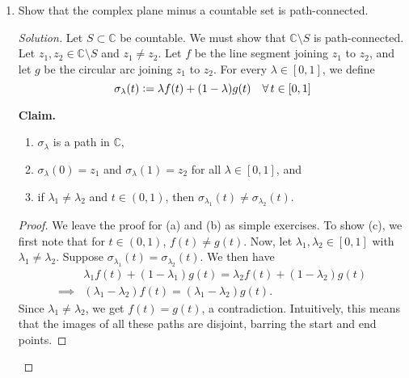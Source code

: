 \documentclass[11pt]{article}
\theoremstyle{definition}
\newenvironment{blockquote}
{\begin{mdframed}[skipabove=0pt, skipbelow=0pt, innertopmargin=4pt, innerbottommargin=4pt, bottomline=false,topline=false,rightline=false, linewidth=2pt]}
{\end{mdframed}}
\newenvironment{soln}{\begin{proof}[Solution]}{\end{proof}}
\begin{document}
\begin{enumerate}[leftmargin=*]
\begin{soln}
        Since $f(z_1, z_2)$ is non-constant at least one of $z_1$ or $z_2$ must ``appear'' in $f(z_1, z_2)$. Without loss of generality, suppose that $z_2$ appears in $f(z_1, z_2)$. We may write
        \[
            f(z_1, z_2) = \sum_{k=0}^n f_k(z_1) \cdot z_2^k
        \]
        where $n \geq 1$ and $f_k(z_1) \in \mathbb{C}[z_1]$. Moreover, $f_n \neq 0$, and thus, $f_n(z_1)$ has only finitely many roots (possibly zero). Thus, there are infinitely many $\alpha \in \mathbb{C}$ such that $f_n(\alpha) \neq 0$. Since, $n \geq 1$, we have that $f(\alpha, z_2) \in \mathbb{C}[z_2]$ is non-constant for all these infinitely many $\alpha$. By FTA, for each such $\alpha$, there exists $\beta \in \mathbb{C}$ such that $f(\alpha, \beta) = 0$. Thus, there are infinitely many roots of $f(z_1, z_2)$ in $\mathbb{C}^2$ (since it contains all these pairs $(\alpha, \beta)$ as $\alpha$ takes on infinitely many values).
    \end{soln}
    
    \item Show that the complex plane minus a countable set is path-connected.
    
    \begin{soln}
        Let $S \subset \mathbb{C}$ be countable. We must show that $\mathbb{C} \setminus S$ is path-connected. Let $z_1, z_2 \in \mathbb{C} \setminus S$ and $z_1 \neq z_2$. Let $f$ be the line segment joining $z_1$ to $z_2$, and let $g$ be the circular arc joining $z_1$ to $z_2$. For every $\lambda \in [0,1]$, we define
        \[
            \sigma_{\lambda}(t) \vcentcolon= \lambda f(t) + (1-\lambda)g(t) \quad \forall \, t \in [0,1]
        \]
        
        \begin{blockquote}
			\textbf{Claim.} \begin{enumerate}
			    \item $\sigma_{\lambda}$ is a path in $\mathbb{C}$,
			    \item $\sigma_{\lambda}(0) = z_1$ and $\sigma_{\lambda}(1) = z_2$ for all $\lambda \in [0,1]$, and
			    \item if $\lambda_1 \neq \lambda_2$ and $t \in (0,1)$, then $\sigma_{\lambda_1}(t) \neq \sigma_{\lambda_2}(t)$.
			\end{enumerate} 
			\begin{proof} 
				We leave the proof for (a) and (b) as simple exercises. To show (c), we first note that for $t \in (0,1)$, $f(t) \neq g(t)$. Now, let $\lambda_1, \lambda_2 \in [0,1]$ with $\lambda_1 \neq \lambda_2$. Suppose $\sigma_{\lambda_1}(t) = \sigma_{\lambda_2}(t)$. We then have
				\begin{align*}
				    &\lambda_1 f(t) + (1-\lambda_1) g(t) = \lambda_2 f(t) + (1-\lambda_2) g(t) \\ \implies &(\lambda_1 - \lambda_2) f(t) = (\lambda_1 - \lambda_2) g(t).
				\end{align*}
				Since $\lambda_1 \neq \lambda_2$, we get $f(t) = g(t)$, a contradiction. Intuitively, this means that the images of all these paths are disjoint, barring the start and end points. 
			\end{proof}


\end{blockquote}
\end{soln}
\end{enumerate}
\end{document}
